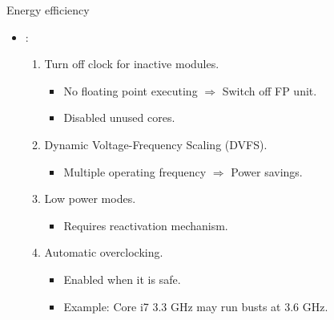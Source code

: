 \begin{frame}[t]{Energy efficiency}
\begin{itemize}
 \item {}:
   \begin{enumerate}
     \item Turn off clock for inactive modules.
       \begin{itemize}
         \item No floating point executing $\Rightarrow$ Switch off FP unit.
         \item Disabled unused cores.
       \end{itemize}

     \item Dynamic Voltage-Frequency Scaling (DVFS).
       \begin{itemize}
         \item Multiple operating frequency $\Rightarrow$ Power savings.
       \end{itemize}

     \item Low power modes.
       \begin{itemize}
         \item Requires reactivation mechanism.
       \end{itemize}

     \item Automatic overclocking.
       \begin{itemize}
         \item Enabled when it is safe.
         \item Example: Core i7 3.3 GHz may run busts at 3.6 GHz.
       \end{itemize}
    \end{enumerate}
\end{itemize}
\end{frame}

